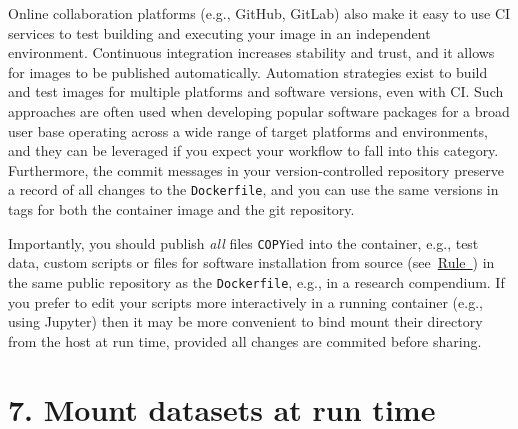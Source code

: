 \documentclass[10pt,letterpaper]{article}
\begin{document}
Online collaboration platforms (e.g., GitHub, GitLab) also make it easy
to use CI services to test building and executing your image in an
independent environment. Continuous integration increases stability and
trust, and it allows for images to be published automatically.
Automation strategies exist to build and test images for multiple
platforms and software versions, even with CI. Such approaches are often
used when developing popular software packages for a broad user base
operating across a wide range of target platforms and environments, and
they can be leveraged if you expect your workflow to fall into this
category. Furthermore, the commit messages in your version-controlled
repository preserve a record of all changes to the \texttt{Dockerfile},
and you can use the same versions in tags for both the container image
and the git repository.

Importantly, you should publish \emph{all} files \texttt{COPY}ied into
the container, e.g., test data, custom scripts or files for software
installation from source
(see~\hyperref[{rule:mount}]{Rule~}) in the same
public repository as the \texttt{Dockerfile}, e.g., in a research
compendium. If you prefer to edit your scripts more interactively in a
running container (e.g., using Jupyter) then it may be more convenient
to bind mount their directory from the host at run time, provided all
changes are commited before sharing.

\hypertarget{mount-datasets-at-run-time}{%
\section*{7. Mount datasets at run
time}\label{mount-datasets-at-run-time}}

  \label{rule:mount} 
\end{document}
